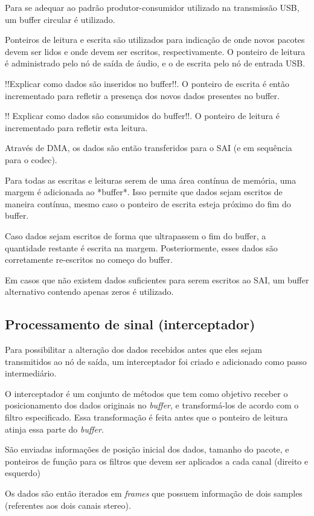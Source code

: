 Para se adequar ao padrão produtor-consumidor utilizado na transmissão USB, um buffer circular é utilizado. 

Ponteiros de leitura e escrita são utilizados para indicação de onde novos pacotes devem ser lidos e onde devem ser escritos, respectivamente. O ponteiro de leitura é administrado pelo nó de saída de áudio, e o de escrita pelo nó de entrada USB.

!!Explicar como dados são inseridos no buffer!!. O ponteiro de escrita é então incrementado para refletir a presença dos novos dados presentes no buffer.

!! Explicar como dados são consumidos do buffer!!. O ponteiro de leitura é incrementado para refletir esta leitura.

Através de DMA, os dados são então transferidos para o SAI (e em sequência para o codec).

Para todas as escritas e leituras serem de uma área contínua de memória, uma margem é adicionada ao *buffer*. Isso permite que dados sejam escritos de maneira contínua, mesmo caso o ponteiro de escrita esteja próximo do fim do buffer.

Caso dados sejam escritos de forma que ultrapassem o fim do buffer, a quantidade restante é escrita na margem. Posteriormente, esses dados são corretamente re-escritos no começo do buffer. 

Em casos que não existem dados suficientes para serem escritos ao SAI, um buffer alternativo contendo apenas zeros é utilizado.


\subsection{Processamento de sinal (interceptador)}
Para possibilitar a alteração dos dados recebidos antes que eles sejam transmitidos ao nó de saída, um interceptador foi criado e adicionado como passo intermediário.

O interceptador é um conjunto de métodos que tem como objetivo receber o posicionamento dos dados originais no \textit{buffer}, e transformá-los de acordo com o filtro especificado. Essa transformação é feita antes que o ponteiro de leitura atinja essa parte do \textit{buffer}.

São enviadas informações de posição inicial dos dados, tamanho do pacote, e ponteiros de função para os filtros que devem ser aplicados a cada canal (direito e esquerdo)

Os dados são então iterados em \textit{frames} que possuem informação de dois samples (referentes aos dois canais stereo).

